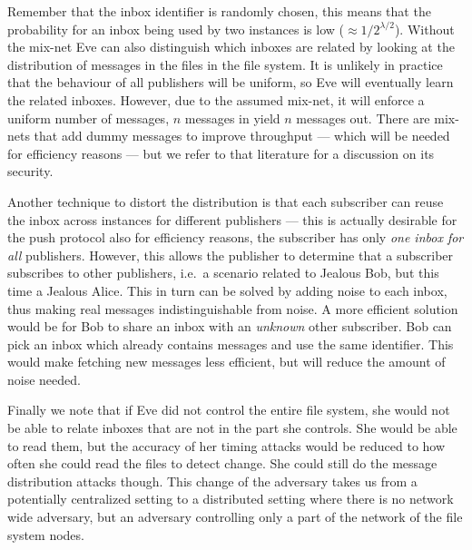 Remember that the inbox identifier is randomly chosen, this means that the 
probability for an inbox being used by two instances is low (\(\approx 
  1/2^{\lambda/2}\)).
Without the mix-net Eve can also distinguish which inboxes are related by 
looking at the distribution of messages in the files in the file system.
It is unlikely in practice that the behaviour of all publishers will be 
uniform, so Eve will eventually learn the related inboxes.
However, due to the assumed mix-net, it will enforce a uniform number of 
messages, \(n\) messages in yield \(n\) messages out.
There are mix-nets that add dummy messages to improve throughput --- which will
be needed for efficiency reasons --- but we refer to that literature for 
a discussion on its security.

Another technique to distort the distribution is that each subscriber can reuse 
the inbox across instances for different publishers --- this is actually 
desirable for the push protocol also for efficiency reasons, the subscriber has 
only \emph{one inbox for all} publishers.
However, this allows the publisher to determine that a subscriber subscribes to 
other publishers, i.e.\ a scenario related to Jealous Bob, but this time 
a Jealous Alice.
This in turn can be solved by adding noise to each inbox, thus making real 
messages indistinguishable from noise.
A more efficient solution would be for Bob to share an inbox with an 
\emph{unknown} other subscriber.
Bob can pick an inbox which already contains messages and use the same 
identifier.
This would make fetching new messages less efficient, but will reduce the 
amount of noise needed.

Finally we note that if Eve did not control the entire file system, she would 
not be able to relate inboxes that are not in the part she controls.
She would be able to read them, but the accuracy of her timing attacks would be
reduced to how often she could read the files to detect change.
She could still do the message distribution attacks though.
This change of the adversary takes us from a potentially centralized setting to 
a distributed setting where there is no network wide adversary, but an 
adversary controlling only a part of the network of the file system nodes.


